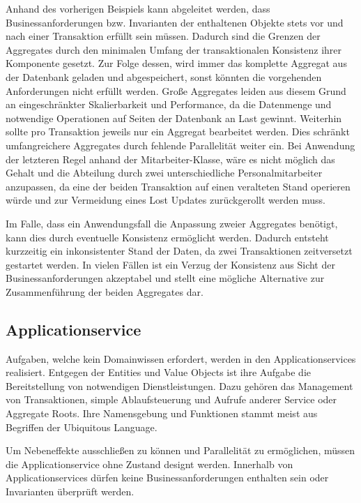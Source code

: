 Anhand des vorherigen Beispiels kann abgeleitet werden, dass Businessanforderungen bzw. Invarianten der enthaltenen Objekte stets vor und nach einer Transaktion erfüllt sein müssen. Dadurch sind die Grenzen der Aggregates durch den minimalen Umfang der transaktionalen Konsistenz ihrer Komponente gesetzt. Zur Folge dessen, wird immer das komplette Aggregat aus der Datenbank geladen und abgespeichert, sonst könnten die vorgehenden Anforderungen nicht erfüllt werden. Große Aggregates leiden aus diesem Grund an eingeschränkter Skalierbarkeit und Performance, da die Datenmenge und notwendige Operationen auf Seiten der Datenbank an Last gewinnt. Weiterhin sollte pro Transaktion jeweils nur ein Aggregat bearbeitet werden. Dies schränkt umfangreichere Aggregates durch fehlende Parallelität weiter ein. Bei Anwendung der letzteren Regel anhand der Mitarbeiter-Klasse, wäre es nicht möglich das Gehalt und die Abteilung durch zwei unterschiedliche Personalmitarbeiter anzupassen, da eine der beiden Transaktion auf einen veralteten Stand operieren würde und zur Vermeidung eines \Gls{Lost Update}s zurückgerollt werden muss. 

Im Falle, dass ein Anwendungsfall die Anpassung zweier Aggregates benötigt, kann dies durch eventuelle Konsistenz ermöglicht werden. Dadurch entsteht kurzzeitig ein inkonsistenter Stand der Daten, da zwei Transaktionen zeitversetzt gestartet werden. In vielen Fällen ist ein Verzug der Konsistenz aus Sicht der Businessanforderungen akzeptabel und stellt eine mögliche Alternative zur Zusammenführung der beiden Aggregates dar.


\subsection{Applicationservice}

Aufgaben, welche kein Domainwissen erfordert, werden in den Applicationservices realisiert. Entgegen der Entities und Value Objects ist ihre Aufgabe die Bereitstellung von notwendigen Dienstleistungen.  Dazu gehören das Management von Transaktionen, simple Ablaufsteuerung und Aufrufe anderer Service oder Aggregate Roots. Ihre Namensgebung und Funktionen stammt meist aus Begriffen der Ubiquitous Language.

Um Nebeneffekte ausschließen zu können und Parallelität zu ermöglichen, müssen die Applicationservice ohne Zustand designt werden. Innerhalb von Applicationservices dürfen keine Businessanforderungen enthalten sein oder Invarianten überprüft werden.

